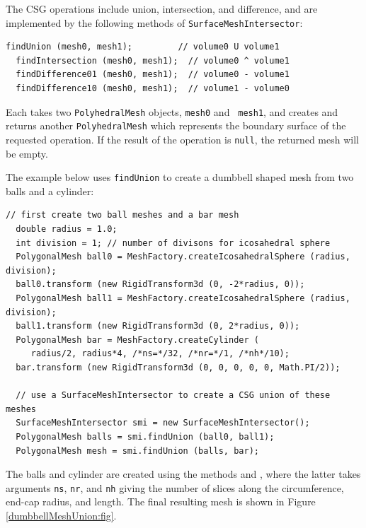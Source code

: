 The CSG operations include union, intersection, and difference, and
are implemented by the following methods of {\tt SurfaceMeshIntersector}:
\begin{lstlisting}[]
  findUnion (mesh0, mesh1);         // volume0 U volume1
  findIntersection (mesh0, mesh1);  // volume0 ^ volume1
  findDifference01 (mesh0, mesh1);  // volume0 - volume1 
  findDifference10 (mesh0, mesh1);  // volume1 - volume0 
\end{lstlisting}
%
Each takes two {\tt PolyhedralMesh} objects, {\tt mesh0} and {\tt
mesh1}, and creates and returns another {\tt PolyhedralMesh} which
represents the boundary surface of the requested operation. If the
result of the operation is {\tt null}, the returned mesh will be empty.

The example below uses {\tt findUnion} to create a dumbbell shaped mesh
from two balls and a cylinder:
%
\begin{lstlisting}[]
  // first create two ball meshes and a bar mesh
  double radius = 1.0;
  int division = 1; // number of divisons for icosahedral sphere
  PolygonalMesh ball0 = MeshFactory.createIcosahedralSphere (radius, division);
  ball0.transform (new RigidTransform3d (0, -2*radius, 0));
  PolygonalMesh ball1 = MeshFactory.createIcosahedralSphere (radius, division);
  ball1.transform (new RigidTransform3d (0, 2*radius, 0));
  PolygonalMesh bar = MeshFactory.createCylinder (
     radius/2, radius*4, /*ns=*/32, /*nr=*/1, /*nh*/10);
  bar.transform (new RigidTransform3d (0, 0, 0, 0, 0, Math.PI/2));

  // use a SurfaceMeshIntersector to create a CSG union of these meshes
  SurfaceMeshIntersector smi = new SurfaceMeshIntersector();
  PolygonalMesh balls = smi.findUnion (ball0, ball1);
  PolygonalMesh mesh = smi.findUnion (balls, bar);
\end{lstlisting}
%
The balls and cylinder are created using the
 methods
and
,
where the latter takes arguments {\tt ns}, {\tt nr}, and {\tt nh}
giving the number of slices along the circumference, end-cap radius,
and length. The final resulting mesh is shown in Figure
\ref{dumbbellMeshUnion:fig}.

%


